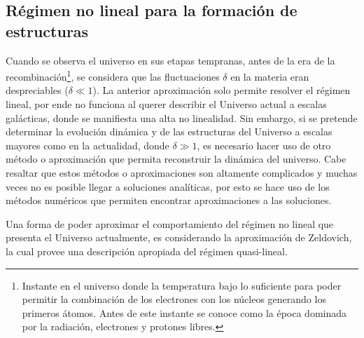 \subsection{Régimen no lineal para la formación de estructuras}
\label{subsec:non-Lineal_Estructure_Formation}

Cuando se observa el universo en sus etapas tempranas, antes de la era de la recombinación\footnote{Instante en el universo donde la temperatura bajo lo suficiente para poder permitir la combinación de los electrones con los núcleos generando los primeros átomos. Antes de este instante se conoce como la época dominada por la radiación, electrones y protones libres.}, se considera que las fluctuaciones $\delta$  en la materia eran despreciables ($\delta \ll 1$). La anterior aproximación solo permite resolver el régimen lineal, por ende no funciona al querer describir el Universo actual a escalas galácticas, donde se manifiesta una alta no linealidad.  Sin embargo, si se pretende determinar la evolución dinámica y de las estructuras del Universo a escalas mayores como en la actualidad, donde $\delta \gg 1$, es necesario hacer uso de otro método o aproximación que permita reconstruir la dinámica del universo. 
Cabe resaltar que estos métodos o aproximaciones son altamente complicados 
y muchas veces no es posible llegar a soluciones analíticas, por esto se hace uso de los métodos numéricos que permiten encontrar aproximaciones a las soluciones. 

Una forma de poder aproximar el comportamiento del régimen no lineal que presenta el Universo actualmente, es considerando la aproximación de Zeldovich, la cual provee una descripción apropiada del régimen quasi-lineal. 



